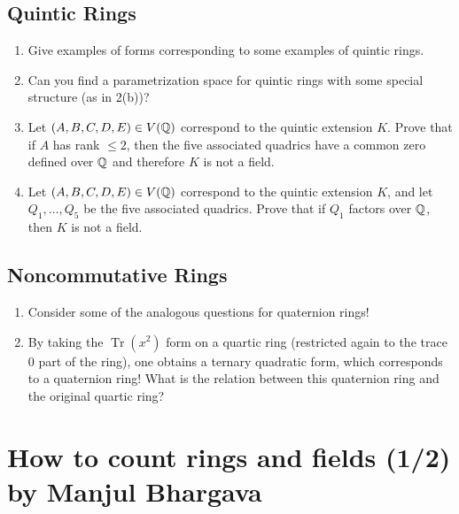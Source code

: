 \documentclass[12pt,amsfont]{amsart}
\begin{document}
\subsection{ {\bf Quintic Rings}}
\begin{enumerate}
         \item Give examples of forms corresponding to some examples of 
quintic rings.
         \item Can you find a parametrization space for quintic rings
           with some special structure (as in 2(b))?
\item Let $(A,B,C,D,E)\in V({\mathbb Q})$ correspond to the quintic extension
  $K$. Prove that if $A$ has rank $\leq 2$, then the five associated
  quadrics have a common zero defined over ${\mathbb Q}$ and therefore $K$ is
  not a field.
\item Let $(A,B,C,D,E)\in V({\mathbb Q})$ correspond to the quintic extension
  $K$, and let $Q_1,\ldots,Q_5$ be the five associated quadrics. Prove
  that if $Q_1$ factors over ${\mathbb Q}$, then $K$ is not a field.

\end{enumerate}

\subsection{ {\bf Noncommutative Rings}}
\begin{enumerate}
         \item Consider some of the analogous questions for quaternion rings!
         \item By taking the $\operatorname{Tr}(x^2)$ form on a quartic
           ring (restricted again to the trace 0 part of the ring), one
           obtains a ternary quadratic form, which corresponds to a
           quaternion ring!  What is the relation between this
           quaternion ring and the original quartic ring?
\end{enumerate}


\begingroup
\renewcommand{\addcontentsline}[3]{}%
\endgroup


\newpage
\renewcommand{\thesubsection}{\arabic{section}.\arabic{subsection}}
\section{How to count rings and fields (1/2)\\ by Manjul Bhargava}\label{12}


\newpage
\renewcommand{\thesubsection}{\arabic{section}.\arabic{subsection}}
\end{document}
